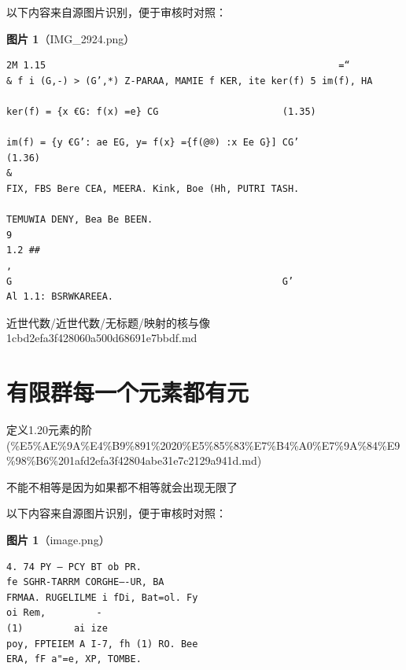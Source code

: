 \begin{note}
以下内容来自源图片识别，便于审核时对照：

\textbf{图片 1}（IMG\_2924.png）
\begin{Verbatim}[fontsize=\small]
2M 1.15                                                    =“
& f i (G,-) > (G’,*) Z-PARAA, MAMIE f KER, ite ker(f) 5 im(f), HA

ker(f) = {x €G: f(x) =e} CG                      (1.35)

im(f) = {y €G’: ae EG, y= f(x} ={f(@®) :x Ee G}] CG’                    (1.36)
&
FIX, FBS Bere CEA, MEERA. Kink, Boe (Hh, PUTRI TASH.

TEMUWIA DENY, Bea Be BEEN.
9
1.2 ##
,
G                                                G’
Al 1.1: BSRWKAREEA.
\end{Verbatim}

\end{note}

\begin{note}[来源路径]

近世代数/近世代数/无标题/映射的核与像 1cbd2efa3f428060a500d68691e7bbdf.md

\end{note}

\section*{有限群每一个元素都有元}

\begin{note}[来源上级主题]

定义1.20元素的阶 (\%E5\%AE\%9A\%E4\%B9\%891\%2020\%E5\%85\%83\%E7\%B4\%A0\%E7\%9A\%84\%E9\%98\%B6\%201afd2efa3f42804abe31e7c2129a941d.md)

\end{note}

\begin{note}[有限群每一个元素都有元]

不能不相等是因为如果都不相等就会出现无限了

\end{note}

\begin{note}
以下内容来自源图片识别，便于审核时对照：

\textbf{图片 1}（image.png）
\begin{Verbatim}[fontsize=\small]
4. 74 PY — PCY BT ob PR.
fe SGHR-TARRM CORGHE—-UR, BA
FRMAA. RUGELILME i fDi, Bat=ol. Fy
oi Rem,         -
(1)         ai ize
poy, FPTEIEM A I-7, fh (1) RO. Bee
ERA, fF a"=e, XP, TOMBE.
\end{Verbatim}

\end{note}

